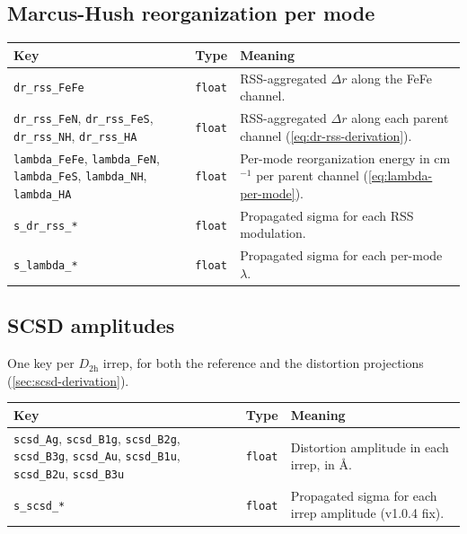 \documentclass[10pt,a4paper,twoside]{article}
\begin{document}
\subsection{Marcus-Hush reorganization per mode}

\begin{longtable}{p{} p{} p{}}
\toprule
\textbf{Key} & \textbf{Type} & \textbf{Meaning} \\
\midrule
\texttt{dr\_rss\_FeFe} & \texttt{float}
  & RSS-aggregated $\Delta r$ along the FeFe channel. \\
\texttt{dr\_rss\_FeN}, \texttt{dr\_rss\_FeS}, \texttt{dr\_rss\_NH},
\texttt{dr\_rss\_HA} & \texttt{float}
  & RSS-aggregated $\Delta r$ along each parent channel
    (\cref{eq:dr-rss-derivation}). \\
\texttt{lambda\_FeFe}, \texttt{lambda\_FeN}, \texttt{lambda\_FeS},
\texttt{lambda\_NH}, \texttt{lambda\_HA} & \texttt{float}
  & Per-mode reorganization energy in cm$^{-1}$ per parent channel
    (\cref{eq:lambda-per-mode}). \\
\texttt{s\_dr\_rss\_*} & \texttt{float}
  & Propagated sigma for each RSS modulation. \\
\texttt{s\_lambda\_*} & \texttt{float}
  & Propagated sigma for each per-mode $\lambda$. \\
\bottomrule
\end{longtable}

\subsection{SCSD amplitudes}

One key per $D_{2\mathrm{h}}$ irrep, for both the reference and the
distortion projections (\cref{sec:scsd-derivation}).

\begin{longtable}{p{} p{} p{}}
\toprule
\textbf{Key} & \textbf{Type} & \textbf{Meaning} \\
\midrule
\texttt{scsd\_Ag},   \texttt{scsd\_B1g}, \texttt{scsd\_B2g}, \texttt{scsd\_B3g},
\texttt{scsd\_Au},   \texttt{scsd\_B1u}, \texttt{scsd\_B2u}, \texttt{scsd\_B3u}
   & \texttt{float}
  & Distortion amplitude in each irrep, in \AA{}. \\
\texttt{s\_scsd\_*} & \texttt{float}
  & Propagated sigma for each irrep amplitude (v1.0.4 fix). \\
\bottomrule
\end{longtable}
\end{document}
